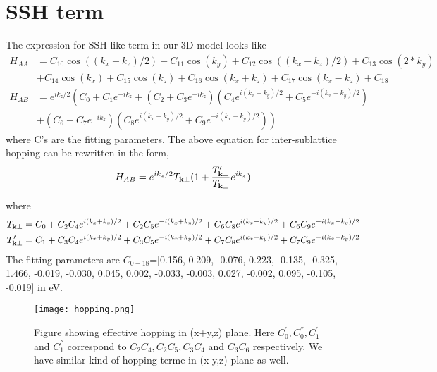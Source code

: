 \documentclass[aps,floatfix,prl]{revtex4}
\begin{document}
\section{SSH term}
The expression for SSH like term in our 3D model looks like
\begin{eqnarray}
H_{AA}&=C_{10} \cos((k_x+k_z)/2)+C_{11}\cos(k_y)+C_{12}\cos((k_x-k_z)/2)+C_{13}\cos(2*k_y)\\
&+C_{14}\cos(k_x)+C_{15}\cos(k_z)+C_{16}\cos(k_x+k_z)+C_{17}\cos(k_x-k_z)+C_{18}\nonumber\\
H_{AB}&=e^{ik_z/2}\left(C_0+C_1e^{-ik_z}+\left(C_2+C_3e^{-ik_z}\right)\left(C_4e^{i(k_x+k_y)/2}+C_5e^{-i(k_x+k_y)/2}\right)\right.\\
&\left.+\left(C_6+C_7e^{-ik_z}\right)\left(C_8e^{i(k_x-k_y)/2}+C_9e^{-i(k_x-k_y)/2}\right)\right)\nonumber
\end{eqnarray}
where C's are the fitting parameters. The above equation for inter-sublattice hopping can be rewritten in the form,
\begin{eqnarray}
H_{AB}=e^{i k_z/2}T_{\bf k\perp}(1+\frac{T'_{\bf k\perp}}{T_{\bf k\perp}}e^{ik_z})\nonumber
\end{eqnarray}

where
\begin{eqnarray}
T_{\bf k\perp}=C_0+C_2C_4e^{i(k_x+k_y)/2}+C_2C_5e^{-i(k_x+k_y)/2}+C_6C_8e^{i(k_x-k_y)/2}+C_6C_9e^{-i(k_x-k_y)/2}\nonumber\\
T'_{\bf k\perp}=C_1+C_3C_4e^{i(k_x+k_y)/2}+C_3C_5e^{-i(k_x+k_y)/2}+C_7C_8e^{i(k_x-k_y)/2}+C_7C_9e^{-i(k_x-k_y)/2}\nonumber\\
\end{eqnarray}
The fitting parameters are $C_{0-18}$=[0.156, 0.209, -0.076, 0.223, -0.135, -0.325, 1.466, -0.019, -0.030, 0.045, 0.002, -0.033, -0.003, 0.027, -0.002, 0.095, -0.105, -0.019] in eV.

\begin{figure}[h]
	\texttt{[image: hopping.png]}
	\caption{\label{phase}Figure showing effective hopping in (x+y,z) plane. Here $C_0^{'},C_0^{''},C_1^{'}$ and $C_1^{''}$ correspond to $C_2 C_4, C_2 C_5, C_3 C_4 $ and $C_3 C_6$ respectively. We have similar kind of hopping terme in (x-y,z) plane as well.}
\end{figure}
\end{document}
